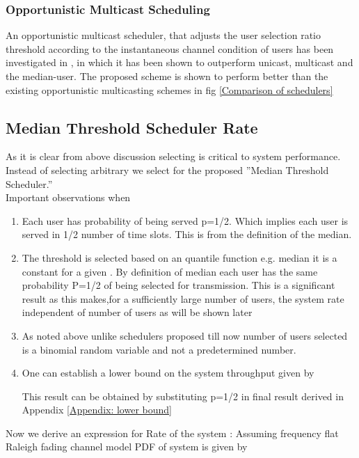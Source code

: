 \documentclass[conference]{IEEEtran}
\begin{document}
\subsubsection{Opportunistic Multicast Scheduling }

An opportunistic multicast scheduler, that adjusts the user selection ratio threshold according to the instantaneous channel condition of users has been investigated in \cite{OMS}, in which it has been shown to outperform unicast, multicast and the median-user. The proposed scheme is shown to perform better than the existing opportunistic multicasting schemes in fig \ref{Comparison of schedulers}

\subsection{Median Threshold Scheduler Rate}

As it is clear from above discussion selecting  is critical to system performance. Instead of selecting arbitrary we select  for the proposed ''Median Threshold Scheduler.''\\
Important observations when \\
\begin{enumerate}
\item Each user has probability of being served p=1/2. Which implies each user is served in 1/2 number of time slots. This is from the definition of the median.
\item The threshold is selected based on an quantile function e.g. median it is a constant for a given  . By definition of median each user has the same probability P=1/2 of being selected for transmission. This is a significant result as this makes,for a sufficiently large number of users, the system rate independent of number of users as will be shown later
\item As noted above unlike schedulers proposed till now number of users selected is a binomial random variable and not a predetermined number.
\item One can establish a lower bound on the system throughput given by 

This result can be obtained by substituting p=1/2 in final result derived in 
 Appendix \ref{Appendix: lower bound}
\end{enumerate}
 


Now we derive an expression for Rate of the system :
Assuming frequency flat Raleigh fading channel model PDF of system is given by \cite{Knoop_and_Humblet} 
\end{document}

